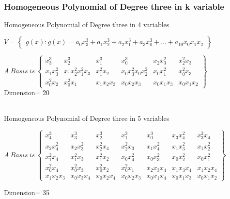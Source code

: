 \documentclass{beamer}
\newenvironment{changemargin}[2]{%
  \begin{list}{}{%
    \setlength{\topsep}{0pt}%
    \setlength{\leftmargin}{#1}%
    \setlength{\rightmargin}{#2}%
    \setlength{\listparindent}{\parindent}%
    \setlength{\itemindent}{\parindent}%
    \setlength{\parsep}{\parskip}%
  }%
  \item[]}{\end{list}}
\begin{document}
\begin{frame}
\frametitle{Homogeneous Polynomial of Degree three in k variable}
\begin{block}{}
\begin{itemize}
    \item Homogeneous Polynomial of Degree three in 4 variables\\
\begin{changemargin}{-4pt}{0pt}
{$V=\begin{Bmatrix}
g(x):g(x)=a_{0}x_{3}^{3}+a_{1}x_{2}^{3}+a_{2}x_{1}^{3}+a_{3}x_{0}^{3}+...+a_{19}x_{0}x_{1}x_{2}
\end{Bmatrix}$}
\end{changemargin}


$A~Basis~ is~\begin{Bmatrix}
x_{3}^{3}&x_{2}^{3}&x_{1}^{3}&x_{0}^{3}&x_{2}x_{3}^{2}&x_{2}^{2}x_{3}\\x_{1}x_{3}^{2}&x_{1}x_{2}^{2}x_{1}^{2}x_{3}&x_{1}^{2}x_{2}& x_{0}x_{3}^{2}x_{0}x_{2}^{2}&x_{0}x_{1}^{2}&x_{0}^{2}x_{3}\\x_{0}^{2}x_{2}&x_{0}^{2}x_{1}&x_{1}x_{2}x_{3}&x_{0}x_{2}x_{3}&x_{0}x_{1}x_{3}&x_{0}x_{1}x_{2}
\end{Bmatrix}$
\\
Dimension= 20\\\\
\item Homogeneous Polynomial of Degree three in 5 variables\\

\begin{changemargin}{-24pt}{0pt}
$A~Basis ~is~\begin{Bmatrix}x_{4}^{3}&x_{3}^{3}&x_{2}^{3}&x_{1}^{3}&x_{0}^{3}&x_{3}x_{4}^{2}&x_{3}^{2}x_{4}\\x_{2}x_{4}^{2}&x_{2}x_{3}^{2}&
x_{2}^{2}x_{4}&x_{2}^{2}x_{3}&x_{1}x_{4}^{2}&x_{1}x_{3}^{2}&x_{1}x_{2}^{2}\\x_{1}^{2}x_{4}&x_{1}^{2}x_{3}&x_{1}^{2}x_{2}&x_{0}x_{4}^{2}&
x_{0}x_{3}^{2}&x_{0}x_{2}^{2}&x_{0}x_{1}^{2}\\x_{0}^{2}x_{4}&x_{0}^{2}x_{3}&x_{0}^{2}x_{2}&x_{0}^{2}x_{1}&x_{2}x_{3}x_{4}&x_{1}x_{3}x_{4}&x_{1}x_{2}x_{4}\\x_{1}x_{2}x_{3}&x_{0}x_{3}x_{4}&x_{0}x_{2}x_{4}&x_{0}x_{2}x_{3}&x_{0}x_{1}x_{4}&x_{0}x_{1}x_{3}&x_{0}x_{1}x_{2}\end{Bmatrix}$
\end{changemargin}
Dimension= 35
\end{itemize}
\end{block}
\end{frame}
\end{document}
